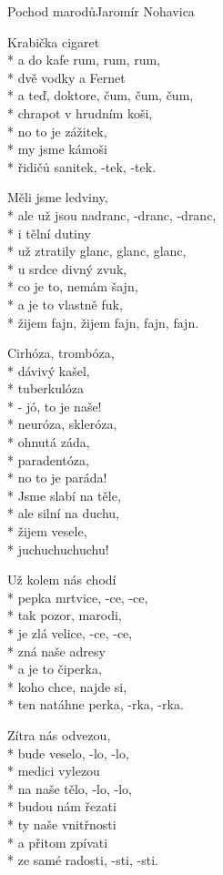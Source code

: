 \documentclass[10.5pt]{book}
\begin{document}
\begin{poem}{Pochod marodů}{Jaromír Nohavica}

\settowidth{\versewidth}{ale už jsou nadranc, -dranc, -dranc,}

Krabička cigaret\\*
a do kafe rum, rum, rum,\\*
dvě vodky a Fernet\\*
a teď, doktore, čum, čum, čum,\\*
chrapot v hrudním koši,\\*
no to je zážitek,\\*
my jsme kámoši\\*
řidičů sanitek, -tek, -tek.

Měli jsme ledviny,\\*
ale už jsou nadranc, -dranc, -dranc,\\*
i tělní dutiny\\*
už ztratily glanc, glanc, glanc,\\*
u srdce divný zvuk,\\*
co je to, nemám šajn,\\*
a je to vlastně fuk,\\*
žijem fajn, žijem fajn, fajn, fajn.

Cirhóza, trombóza,\\*
dávivý kašel,\\*
tuberkulóza\\*
- jó, to je naše!\\*
neuróza, skleróza,\\*
ohnutá záda,\\*
paradentóza,\\*
no to je paráda!\\*
Jsme slabí na těle,\\*
ale silní na duchu,\\*
žijem vesele,\\*
juchuchuchuchu!

Už kolem nás chodí\\*
pepka mrtvice, -ce, -ce,\\*
tak pozor, marodi,\\*
je zlá velice, -ce, -ce,\\*
zná naše adresy\\*
a je to čiperka,\\*
koho chce, najde si,\\*
ten natáhne perka, -rka, -rka.

Zítra nás odvezou,\\*
bude veselo, -lo, -lo,\\*
medici vylezou\\*
na naše tělo, -lo, -lo,\\*
budou nám řezati\\*
ty naše vnitřnosti\\*
a přitom zpívati\\*
ze samé radosti, -sti, -sti.


\end{poem}
\end{document}
